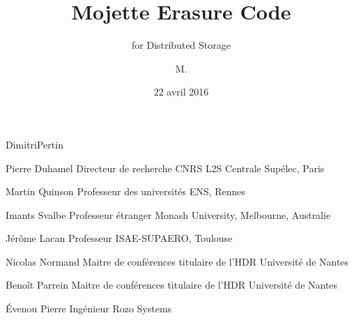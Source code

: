 



\title{Mojette Erasure Code}

\subtitle{for Distributed Storage}


\author{M.}{Dimitri}{Pertin}






\thesisnumber{}

\date{22 avril 2016}

    {Pierre}
    {Duhamel}
    {Directeur de recherche CNRS}
    {L2S Centrale Supélec, Paris}

    {Martin}
    {Quinson}
    {Professeur des universités}
    {ENS, Rennes}

    {Imants}
    {Svalbe}
    {Professeur étranger}
    {Monash University, Melbourne, Australie}

    {Jérôme}
    {Lacan}
    {Professeur}
    {ISAE-SUPAERO, Toulouse}

    {Nicolas}
    {Normand}
    {Maitre de conférences titulaire de l'HDR}
    {Université de Nantes}
 
    {Benoît}
    {Parrein}
    {Maitre de conférences titulaire de l'HDR}
    {Université de Nantes}   

    {Évenou}
    {Pierre}
    {Ingénieur}
    {Rozo Systems}




\begin{resume}
    \footnotesize
    
\end{resume}

